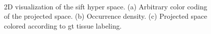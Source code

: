 \documentclass[a4paper, 10pt, conference]{llncs}      %
\begin{document}
\begin{figure}[Htbp]
\centering
{}\,
\,
\caption{2D visualization of the \acs{sift} hyper space. (a) Arbitrary color coding of the projected space. (b) Occurrence density. (c) Projected space colored according to \acs{gt} tissue labeling.}
\label{fig:siftMapping}
\end{figure}
\end{document}
